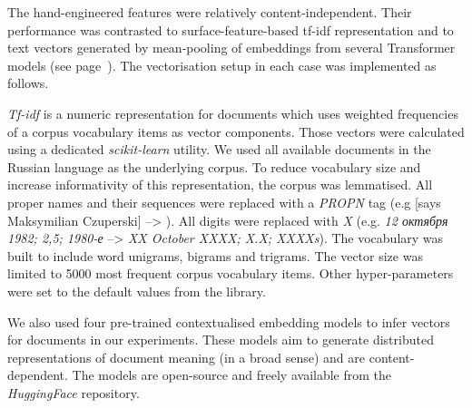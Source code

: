 The hand-engineered features were relatively content-independent. Their performance was contrasted to surface-feature-based \gls*{tf-idf} representation and to text vectors generated by mean-pooling of embeddings from several Transformer models (see page~\pageref{pg:embeddings}).
The vectorisation setup in each case was implemented as follows.

\label{pg:tfidf_meth}
\textit{Tf-idf} is a numeric representation for documents which uses weighted frequencies of a corpus vocabulary items as vector components. Those vectors were calculated using a dedicated \textit{scikit-learn} utility. We used all available documents in the Russian language as the underlying corpus. 
To reduce vocabulary size and increase informativity of this representation, the corpus was lemmatised. All proper names and their sequences were replaced with a \textit{PROPN} tag (e.g  [says Maksymilian Czuperski] --> ). All digits were replaced with \textit{X} (e.g. \textit{12 октября 1982; 2,5;  1980-е} --> \textit{XX October XXXX; X.X; XXXXs}). The vocabulary was built to include word unigrams, bigrams and trigrams. The vector size was limited to 5000 most frequent corpus vocabulary items. Other hyper-parameters were set to the default values from the library. 

We also used four pre-trained contextualised embedding models to infer vectors for documents in our experiments. These models aim to generate distributed representations of document meaning (in a broad sense) and are content-dependent. The models are open-source and freely available from the \textit{HuggingFace} repository.

